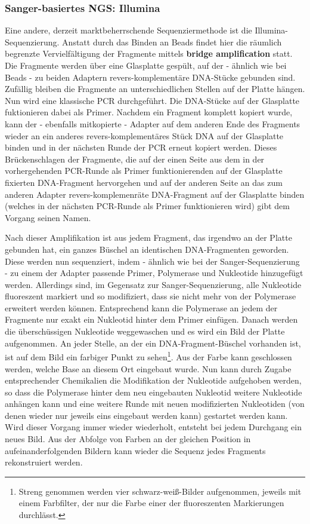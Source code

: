 \subsubsection{Sanger-basiertes NGS: Illumina}

Eine andere, derzeit marktbeherrschende Sequenziermethode ist die Illumina-Sequenzierung. Anstatt durch das Binden an Beads findet hier die räumlich begrenzte Vervielfältigung der Fragmente mittels \textbf{bridge amplification} statt. Die Fragmente werden über eine Glasplatte gespült, auf der - ähnlich wie bei Beads - zu beiden Adaptern revers-komplementäre DNA-Stücke gebunden sind. Zufällig bleiben die Fragmente an unterschiedlichen Stellen auf der Platte hängen. Nun wird eine klassische PCR durchgeführt. Die DNA-Stücke auf der Glasplatte fuktionieren dabei als Primer. Nachdem ein Fragment komplett kopiert wurde, kann der - ebenfalls mitkopierte - Adapter auf dem anderen Ende des Fragments wieder an ein anderes revers-komplementäres Stück DNA auf der Glasplatte binden und in der nächsten Runde der PCR erneut kopiert werden. Dieses Brückenschlagen der Fragmente, die auf der einen Seite aus dem in der vorhergehenden PCR-Runde als Primer funktionierenden auf der Glasplatte fixierten DNA-Fragment hervorgehen und auf der anderen Seite an das zum anderen Adapter revers-komplemenräte DNA-Fragment auf der Glasplatte binden (welches in der nächsten PCR-Runde als Primer funktionieren wird) gibt dem Vorgang seinen Namen.

Nach dieser Amplifikation ist aus jedem Fragment, das irgendwo an der Platte gebunden hat, ein ganzes Büschel an identischen DNA-Fragmenten geworden. Diese werden nun sequenziert, indem - ähnlich wie bei der Sanger-Sequenzierung - zu einem der Adapter passende Primer, Polymerase und Nukleotide hinzugefügt werden. Allerdings sind, im Gegensatz zur Sanger-Sequenzierung, alle Nukleotide fluoreszent markiert und so modifiziert, dass sie nicht mehr von der Polymerase erweitert werden können. Entsprechend kann die Polymerase an jedem der Fragmente nur exakt ein Nukleotid hinter dem Primer einfügen. Danach werden die überschüssigen Nukleotide weggewaschen und es wird ein Bild der Platte aufgenommen. An jeder Stelle, an der ein DNA-Fragment-Büschel vorhanden ist, ist auf dem Bild ein farbiger Punkt zu sehen\footnote{Streng genommen werden vier schwarz-weiß-Bilder aufgenommen, jeweils mit einem Farbfilter, der nur die Farbe einer der fluoreszenten Markierungen durchlässt.}. Aus der Farbe kann geschlossen werden, welche Base an diesem Ort eingebaut wurde. Nun kann durch Zugabe entsprechender Chemikalien die Modifikation der Nukleotide aufgehoben werden, so dass die Polymerase hinter dem neu eingebauten Nukleotid weitere Nukleotide anhängen kann und eine weitere Runde mit neuen modifizierten Nukleotiden (von denen wieder nur jeweils eins eingebaut werden kann) gestartet werden kann. Wird dieser Vorgang immer wieder wiederholt, entsteht bei jedem Durchgang ein neues Bild. Aus der Abfolge von Farben an der gleichen Position in aufeinanderfolgenden Bildern kann wieder die Sequenz jedes Fragments rekonstruiert werden.


